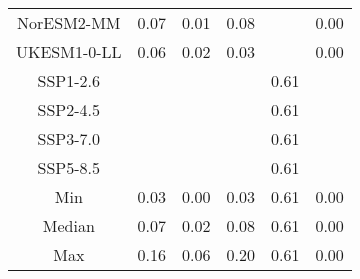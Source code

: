 \begin{table*}[t]
\begin{tabular}{c|rrr|rr}
NorESM2-MM & 0.07 & 0.01 & 0.08 &  & 0.00 \\
UKESM1-0-LL & 0.06 & 0.02 & 0.03 &  & 0.00 \\
SSP1-2.6 &  &  &  & 0.61 &  \\
SSP2-4.5 &  &  &  & 0.61 &  \\
SSP3-7.0 &  &  &  & 0.61 &  \\
SSP5-8.5 &  &  &  & 0.61 &  \\
\midrule
Min & 0.03 & 0.00 & 0.03 & 0.61 & 0.00 \\
Median & 0.07 & 0.02 & 0.08 & 0.61 & 0.00 \\
Max & 0.16 & 0.06 & 0.20 & 0.61 & 0.00 \\
\bottomrule
\end{tabular}
\end{table*}

